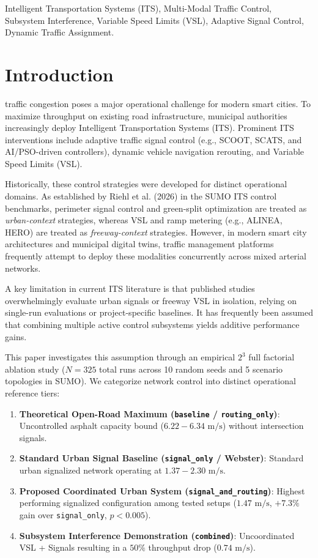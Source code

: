 \documentclass[journal,twocolumn]{IEEEtran}
\begin{document}
\begin{IEEEkeywords}
Intelligent Transportation Systems (ITS), Multi-Modal Traffic Control, Subsystem Interference, Variable Speed Limits (VSL), Adaptive Signal Control, Dynamic Traffic Assignment.
\end{IEEEkeywords}

\section{Introduction}
 traffic congestion poses a major operational challenge for modern smart cities. To maximize throughput on existing road infrastructure, municipal authorities increasingly deploy Intelligent Transportation Systems (ITS). Prominent ITS interventions include adaptive traffic signal control (e.g., SCOOT, SCATS, and AI/PSO-driven controllers), dynamic vehicle navigation rerouting, and Variable Speed Limits (VSL).

Historically, these control strategies were developed for distinct operational domains. As established by Riehl et al. (2026) in the SUMO ITS control benchmarks, perimeter signal control and green-split optimization are treated as \emph{urban-context} strategies, whereas VSL and ramp metering (e.g., ALINEA, HERO) are treated as \emph{freeway-context} strategies. However, in modern smart city architectures and municipal digital twins, traffic management platforms frequently attempt to deploy these modalities concurrently across mixed arterial networks.

A key limitation in current ITS literature is that published studies overwhelmingly evaluate urban signals or freeway VSL in isolation, relying on single-run evaluations or project-specific baselines. It has frequently been assumed that combining multiple active control subsystems yields additive performance gains.

This paper investigates this assumption through an empirical $2^3$ full factorial ablation study ($N=325$ total runs across 10 random seeds and 5 scenario topologies in SUMO). We categorize network control into distinct operational reference tiers:
\begin{enumerate}
    \item \textbf{Theoretical Open-Road Maximum (\texttt{baseline} / \texttt{routing\_only})}: Uncontrolled asphalt capacity bound ($6.22 - 6.34\text{ m/s}$) without intersection signals.
    \item \textbf{Standard Urban Signal Baseline (\texttt{signal\_only} / Webster)}: Standard urban signalized network operating at $1.37 - 2.30\text{ m/s}$.
    \item \textbf{Proposed Coordinated Urban System (\texttt{signal\_and\_routing})}: Highest performing signalized configuration among tested setups ($1.47\text{ m/s}$, $+7.3\%$ gain over \texttt{signal\_only}, $p < 0.005$).
    \item \textbf{Subsystem Interference Demonstration (\texttt{combined})}: Uncoordinated VSL + Signals resulting in a $50\%$ throughput drop ($0.74\text{ m/s}$).
\end{enumerate}
\end{document}
